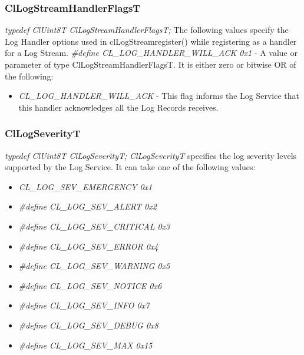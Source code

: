 \begin{flushleft}
\subsubsection{ClLogStreamHandlerFlagsT}
\textit{typedef ClUint8T ClLogStreamHandlerFlagsT;}
\newline
\newline
The following values specify the Log Handler options used in clLogStreamregister() while registering as a handler for a Log Stream.
\newline 
\newline
\textit{\#define CL\_\-LOG\_\-HANDLER\_\-WILL\_\-ACK	0x1} - A value or parameter of type ClLogStreamHandlerFlagsT. It is either zero or bitwise OR of
the following: 
\begin{itemize}
\item
\textit{CL\_\-LOG\_\-HANDLER\_\-WILL\_\-ACK} - This flag informs the Log Service that this handler acknowledges all the Log Records receives.
\end{itemize}




\subsubsection{ClLogSeverityT}
\textit{typedef ClUint8T ClLogSeverityT;}
\newline
\newline
\textit{ClLogSeverityT} specifies the log severity levels supported by the Log Service. It can take one of the following values:
\begin{itemize}
\item \textit{CL\_\-LOG\_\-SEV\_\-EMERGENCY 0x1}
	\item\textit{\#define CL\_\-LOG\_\-SEV\_\-ALERT 0x2}
	\item\textit{\#define CL\_\-LOG\_\-SEV\_\-CRITICAL 0x3}
	\item\textit{\#define CL\_\-LOG\_\-SEV\_\-ERROR 0x4}
	\item\textit{\#define CL\_\-LOG\_\-SEV\_\-WARNING 0x5}
	\item\textit{\#define CL\_\-LOG\_\-SEV\_\-NOTICE 0x6}
	\item\textit{\#define CL\_\-LOG\_\-SEV\_\-INFO 0x7}
	\item\textit{\#define CL\_\-LOG\_\-SEV\_\-DEBUG 0x8}
	\item\textit{\#define CL\_\-LOG\_\-SEV\_\-MAX 0x15}
\end{itemize}	



\end{flushleft}
